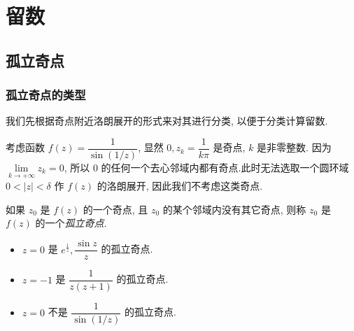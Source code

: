 
\chapter{留数}
\section{孤立奇点}

\subsection{孤立奇点的类型}

我们先根据奇点附近洛朗展开的形式来对其进行分类, 以便于分类计算留数.

\begin{example}
		考虑函数 $f(z)=\dfrac1{\sin(1/z)}$, 显然 $0,z_k=\dfrac1{k\pi}$ 是奇点, $k$ 是非零整数.
	{因为 $\lim\limits_{k\to+\infty} z_k=0$, 所以 $0$ 的任何一个去心邻域内都有奇点.此时无法选取一个圆环域 $0<|z|<\delta$ 作 $f(z)$ 的洛朗展开, 因此我们不考虑这类奇点.
	}
	{
	\begin{center}
	\end{center}}
\end{example}

\begin{definition}
	如果 $z_0$ 是 $f(z)$ 的一个奇点, 且 $z_0$ 的某个邻域内没有其它奇点, 则称 $z_0$ 是 $f(z)$ 的一个\emph{孤立奇点}.
\end{definition}

\begin{example}
	\begin{itemize}
		\item $z=0$ 是 $e^{\frac1z},\dfrac{\sin z}z$ 的孤立奇点.
		\item $z=-1$ 是 $\dfrac1{z(z+1)}$ 的孤立奇点.
		\item $z=0$ 不是 $\dfrac1{\sin(1/z)}$ 的孤立奇点.
	\end{itemize}
\end{example}

